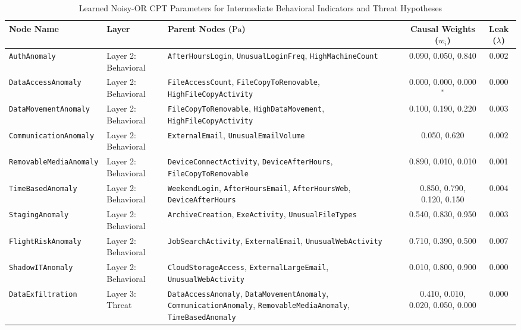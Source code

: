 \documentclass[12pt,a4paper]{report}
\begin{document}
\begin{table}[H]
\centering
\caption{Learned Noisy-OR CPT Parameters for Intermediate Behavioral Indicators and Threat Hypotheses}
\label{tab:noisyor_cpt}
\fontsize{8.5}{10.5}\selectfont
\begin{tabularx}{\textwidth}{p{}p{}Xcc}
\toprule
\textbf{Node Name} & \textbf{Layer} & \textbf{Parent Nodes ($\text{Pa}$)} & \textbf{Causal Weights ($w_i$)} & \textbf{Leak ($\lambda$)} \\
\midrule
\texttt{AuthAnomaly} & Layer 2: Behavioral & \texttt{AfterHoursLogin}, \texttt{UnusualLoginFreq}, \texttt{HighMachineCount} & 0.090, 0.050, 0.840 & 0.002 \\
\texttt{DataAccessAnomaly} & Layer 2: Behavioral & \texttt{FileAccessCount}, \texttt{FileCopyToRemovable}, \texttt{HighFileCopyActivity} & 0.000, 0.000, 0.000$^*$ & 0.000 \\
\texttt{DataMovementAnomaly} & Layer 2: Behavioral & \texttt{FileCopyToRemovable}, \texttt{HighDataMovement}, \texttt{HighFileCopyActivity} & 0.100, 0.190, 0.220 & 0.003 \\
\texttt{CommunicationAnomaly}& Layer 2: Behavioral & \texttt{ExternalEmail}, \texttt{UnusualEmailVolume} & 0.050, 0.620 & 0.002 \\
\texttt{RemovableMediaAnomaly}& Layer 2: Behavioral & \texttt{DeviceConnectActivity}, \texttt{DeviceAfterHours}, \texttt{FileCopyToRemovable} & 0.890, 0.010, 0.010 & 0.001 \\
\texttt{TimeBasedAnomaly} & Layer 2: Behavioral & \texttt{WeekendLogin}, \texttt{AfterHoursEmail}, \texttt{AfterHoursWeb}, \texttt{DeviceAfterHours} & 0.850, 0.790, 0.120, 0.150 & 0.004 \\
\texttt{StagingAnomaly} & Layer 2: Behavioral & \texttt{ArchiveCreation}, \texttt{ExeActivity}, \texttt{UnusualFileTypes} & 0.540, 0.830, 0.950 & 0.003 \\
\texttt{FlightRiskAnomaly} & Layer 2: Behavioral & \texttt{JobSearchActivity}, \texttt{ExternalEmail}, \texttt{UnusualWebActivity} & 0.710, 0.390, 0.500 & 0.007 \\
\texttt{ShadowITAnomaly} & Layer 2: Behavioral & \texttt{CloudStorageAccess}, \texttt{ExternalLargeEmail}, \texttt{UnusualWebActivity} & 0.010, 0.800, 0.900 & 0.000 \\
\midrule
\texttt{DataExfiltration} & Layer 3: Threat & \texttt{DataAccessAnomaly}, \texttt{DataMovementAnomaly}, \texttt{CommunicationAnomaly}, \texttt{RemovableMediaAnomaly}, \texttt{TimeBasedAnomaly} & 0.410, 0.010, 0.020, 0.050, 0.000 & 0.000 \\

\end{tabularx}
\end{table}
\end{document}
